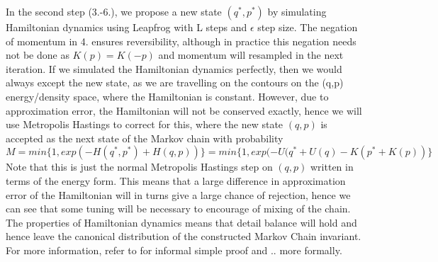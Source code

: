 \documentclass[11pt]{article}
\begin{document}
In the second step (3.-6.), we propose a new state $(q^{*}, p^{*})$ by simulating Hamiltonian dynamics using Leapfrog with L steps and $\epsilon$ step size. The negation of momentum in 4. ensures reversibility, although in practice this negation needs not be done as $K(p)=K(-p)$ and momentum will resampled in the next iteration. If we simulated the Hamiltonian dynamics perfectly, then we would always except the new state, as we are travelling on the contours on the (q,p) energy/density space, where the Hamiltonian is constant. However, due to approximation error, the Hamiltonian will not be conserved exactly, hence we will use Metropolis Hastings to correct for this, where the new state $(q,p)$ is accepted as the next state of the Markov chain with probability
\begin{equation}
M=min\{1,exp(-H(q^{*},p^{*})+H(q,p))\} = min\{1, exp(-U(q^{*}+U(q)-K(p^{*}+K(p))\}
\end{equation}
Note that this is just the normal Metropolis Hastings step on $(q,p)$ written in terms of the energy form. This means that a large difference in approximation error of the Hamiltonian  will in turns give a large chance of rejection, hence we can see that some tuning will be necessary to encourage of mixing of the chain. The properties of Hamiltonian dynamics means that detail balance will hold and hence leave the canonical distribution of the constructed Markov Chain invariant. For more information, refer to for informal simple proof and .. more formally. 
\end{document}
